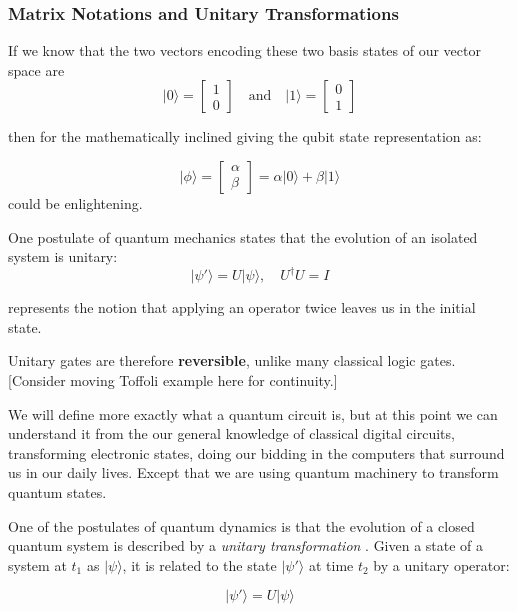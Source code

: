 \subsubsection{Matrix Notations and Unitary Transformations}

If we know that the two vectors encoding these two basis states of our vector space are
$$\lvert0\rangle = \begin{bmatrix} 1 \\ 0 \end{bmatrix} \quad \textrm{and} \quad \lvert1\rangle = \begin{bmatrix} 0 \\ 1 \end{bmatrix}$$

then for the mathematically inclined giving the qubit state representation as:

$$\lvert\phi\rangle = \begin{bmatrix} \alpha \\ \beta \end{bmatrix} = \alpha\lvert0\rangle + \beta\lvert1\rangle$$
could be enlightening.

One postulate of quantum mechanics states that the evolution of an isolated system is unitary:
$$ \lvert \psi'\rangle = U \lvert \psi \rangle, \quad U^{\dagger} U = I$$

represents the notion that applying an operator twice leaves us in the initial state.

Unitary gates are therefore \textbf{reversible}, unlike many classical logic gates. [Consider moving Toffoli example here for continuity.]


We will define more exactly what a quantum circuit is, 
but at this point we can understand it from the our general knowledge of classical digital circuits,
transforming electronic states, doing our bidding in the computers that surround us in our daily lives.
Except that we are using quantum machinery to transform quantum states.

One of the postulates of quantum dynamics is that the evolution of a closed quantum system is described by a
\emph{unitary transformation} \cite{Nielsen:2000}.  
Given a state of a system at $t_1$ as $|\psi\rangle$, it is related to the state $|\psi'\rangle$ at time $t_2$ 
by a unitary operator:

$$|\psi'\rangle = U|\psi\rangle$$

